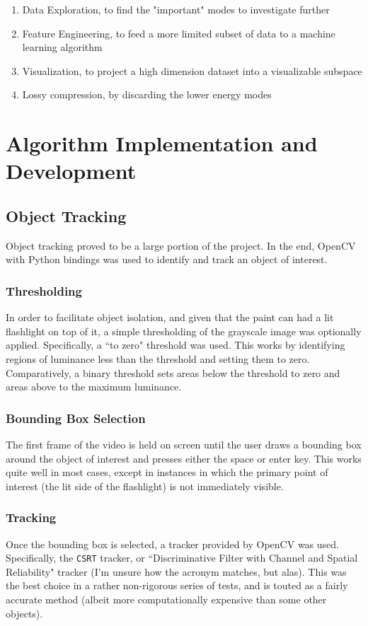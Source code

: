 \documentclass[journal]{IEEEtran}
\def\code#1{\texttt{#1}}
\begin{document}
\begin{enumerate}
	\item Data Exploration, to find the "important" modes to investigate further
	\item Feature Engineering, to feed a more limited subset of data to a machine learning algorithm
	\item Visualization, to project a high dimension dataset into a visualizable subspace
	\item Lossy compression, by discarding the lower energy modes
\end{enumerate}

\section{Algorithm Implementation and Development}

\subsection{Object Tracking}

Object tracking proved to be a large portion of the project. In the end, OpenCV with Python
bindings was used to identify and track an object of interest.

\subsubsection{Thresholding}
In order to facilitate object isolation, and given that the paint can had a lit flashlight on top
of it, a simple thresholding of the grayscale image was optionally applied. Specifically, a
``to zero" threshold was used. This works by identifying regions of luminance less than the
threshold and setting them to zero. Comparatively, a binary threshold sets areas below the
threshold to zero and areas above to the maximum luminance. 

\subsubsection{Bounding Box Selection}
The first frame of the video is held on screen until the user draws a bounding box around the
object of interest and presses either the space or enter key. This works quite well in most cases,
except in instances in which the primary point of interest (the lit side of the flashlight) is not
immediately visible.

\subsubsection{Tracking}
Once the bounding box is selected, a tracker provided by OpenCV was used. Specifically, the
\code{CSRT} tracker, or ``Discriminative Filter with Channel and Spatial Reliability" tracker (I'm
unsure how the acronym matches, but alas). This was the best choice in a rather non-rigorous series
of tests, and is touted as a fairly accurate method (albeit more computationally expensive than
some other objects).
\end{document}
